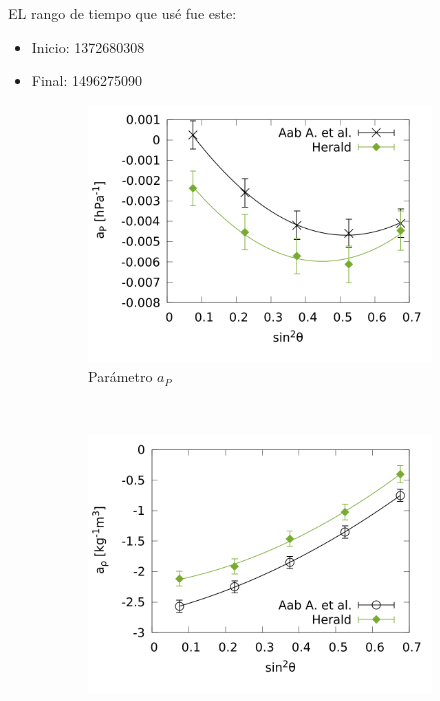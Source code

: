       EL rango de tiempo que usé fue este: 
      \begin{itemize}
        \item Inicio: 1372680308
        \item Final: 1496275090
      \end{itemize}
        \begin{figure}[H]
          \centering
          \begin{subfigure}[b]{0.5\textwidth}
          \includegraphics[width=\linewidth]{../03_IntroduccionReport/params/ap_2017_above_1EeV.png}
          \caption{Parámetro $a_P$ }
          \label{fig:ap_2017_1EeV}
          \end{subfigure}\\
          \begin{subfigure}[b]{0.5\textwidth}
          \includegraphics[width=\linewidth]{../03_IntroduccionReport/params/arho_2017_above_1EeV.png}

\end{subfigure}
\end{figure}
